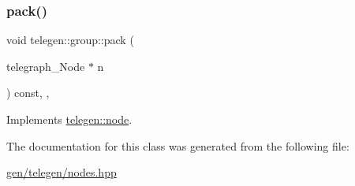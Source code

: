 \mbox{\label{classtelegen_1_1group_ae146155bf745b0b3d39e3244c3ebb26d}} 
\subsubsection{\texorpdfstring{pack()}{pack()}\hspace{0.1cm}{\footnotesize\ttfamily [2/2]}}
{\footnotesize\ttfamily void telegen\+::group\+::pack (\begin{DoxyParamCaption}\item[{telegraph\+\_\+\+Node $\ast$}]{n }\end{DoxyParamCaption}) const\hspace{0.3cm}{\ttfamily [inline]}, {\ttfamily [override]}, {\ttfamily [virtual]}}



Implements \hyperlink{classtelegen_1_1node_a8b6169d62f6e7c2e301435e52442fed3}{telegen\+::node}.



The documentation for this class was generated from the following file\+:\begin{DoxyCompactItemize}
\item 
\hyperlink{gen_2telegen_2nodes_8hpp}{gen/telegen/nodes.\+hpp}\end{DoxyCompactItemize}
